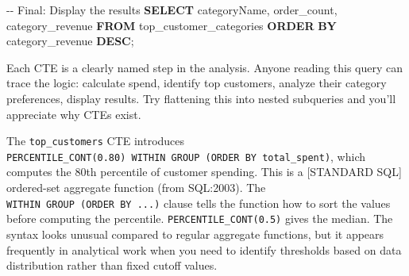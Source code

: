 \documentclass[
  letterpaper,
  DIV=11,
  numbers=noendperiod]{scrreprt}
\newenvironment{Shaded}{\begin{snugshade}}{\end{snugshade}}
\newcommand{\CommentTok}[1]{\textcolor[rgb]{0.37,0.37,0.37}{#1}}
\newcommand{\KeywordTok}[1]{\textcolor[rgb]{0.00,0.23,0.31}{\textbf{#1}}}
\newcommand{\NormalTok}[1]{\textcolor[rgb]{0.00,0.23,0.31}{#1}}
\begin{document}
\begin{codelisting}
\begin{Shaded}
\begin{Highlighting}[]
\CommentTok{{-}{-} Final: Display the results}
\KeywordTok{SELECT}
\NormalTok{    categoryName,}
\NormalTok{    order\_count,}
\NormalTok{    category\_revenue}
\KeywordTok{FROM}\NormalTok{ top\_customer\_categories}
\KeywordTok{ORDER} \KeywordTok{BY}\NormalTok{ category\_revenue }\KeywordTok{DESC}\NormalTok{;}
\end{Highlighting}
\end{Shaded}

\end{codelisting}

Each CTE is a clearly named step in the analysis. Anyone reading this
query can trace the logic: calculate spend, identify top customers,
analyze their category preferences, display results. Try flattening this
into nested subqueries and you'll appreciate why CTEs exist.

\begin{tcolorbox}[enhanced jigsaw, opacitybacktitle=0.6, arc=.35mm, colback=white, bottomtitle=1mm, opacityback=0, toprule=.15mm, left=2mm, colbacktitle=quarto-callout-note-color!10!white, breakable, coltitle=black, toptitle=1mm, colframe=quarto-callout-note-color-frame, bottomrule=.15mm, titlerule=0mm, title=\textcolor{quarto-callout-note-color}{\faInfo}\hspace{0.5em}{A New Function: PERCENTILE\_CONT}, rightrule=.15mm, leftrule=.75mm]

The \texttt{top\_customers} CTE introduces
\texttt{PERCENTILE\_CONT(0.80)\ WITHIN\ GROUP\ (ORDER\ BY\ total\_spent)},
which computes the 80th percentile of customer spending. This is a
{[}STANDARD SQL{]} ordered-set aggregate function (from SQL:2003). The
\texttt{WITHIN\ GROUP\ (ORDER\ BY\ ...)} clause tells the function how
to sort the values before computing the percentile.
\texttt{PERCENTILE\_CONT(0.5)} gives the median. The syntax looks
unusual compared to regular aggregate functions, but it appears
frequently in analytical work when you need to identify thresholds based
on data distribution rather than fixed cutoff values.

\end{tcolorbox}
\end{document}
